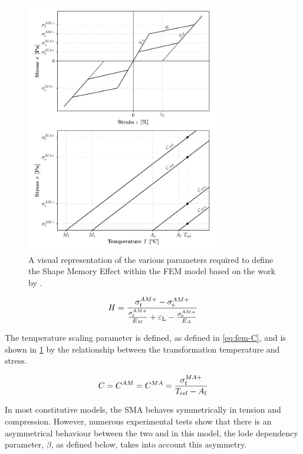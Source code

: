 \begin{figure}[hbt!]
    \centering
    \includegraphics[width=0.75\textwidth]{images/chap2/fem-wp-graph.pdf}
    \caption{A visual representation of the various parameters required to define the Shape Memory Effect within the FEM model based on the work by \cite{jaberAnsysParametersShape2018}.}
    \label{fig:fem-wp-graph}
\end{figure}

\begin{equation}
    \label{eq:fem-h}
    H = \frac{\sigma_\mathrm{f}^{AM+}-\sigma_\mathrm{s}^{AM+}}{\frac{\sigma_\mathrm{f}^{AM+}}{E_M}+\varepsilon_\mathrm{L}-\frac{\sigma_\mathrm{s}^{AM+}}{E_A}}
\end{equation}

The temperature scaling parameter is defined, as defined in \cref{eq:fem-C}, and is shown in \cref{fig:fem-wp-graph} by the relationship between the transformation temperature and stress.

\begin{equation}
    \label{eq:fem-C}
    C = C^{AM}=C^{MA}=\frac{\sigma_\mathrm{f}^{MA+}}{T_\mathrm{ref}-A_\mathrm{f}}
\end{equation}

In most constitutive models, the SMA behaves symmetrically in tension and compression. However, numerous experimental tests show that there is an asymmetrical behaviour between the two and in this model, the lode dependency parameter, $\beta$, as defined below, takes into account this asymmetry.

